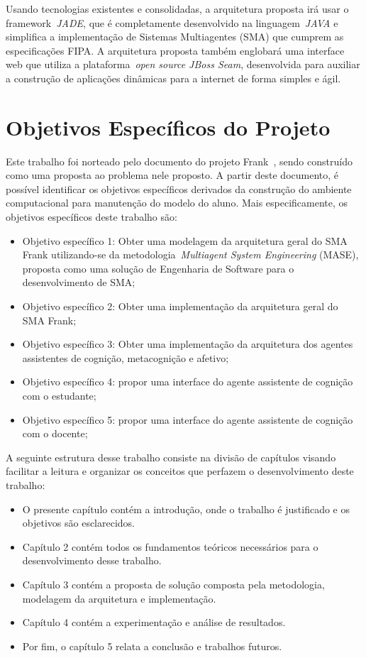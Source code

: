 Usando tecnologias existentes e consolidadas, a arquitetura proposta irá usar o framework~\emph{JADE}, que é completamente desenvolvido na linguagem~\emph{JAVA} e simplifica a implementação de Sistemas Multiagentes (SMA) que cumprem as especificações FIPA. A arquitetura proposta também englobará uma interface web que utiliza a plataforma~\emph{open source JBoss Seam}, desenvolvida para auxiliar a construção de aplicações dinâmicas para a internet de forma simples e ágil.

\section{Objetivos Específicos do Projeto}
Este trabalho foi norteado pelo documento do projeto Frank~\cite{editalFrank}, sendo construído como uma proposta ao problema nele proposto. A partir deste documento, é possível identificar os objetivos específicos derivados da construção do ambiente computacional para manutenção do modelo do aluno. Mais especificamente, os objetivos específicos deste trabalho são:
\begin{itemize}
 	\item Objetivo específico 1: Obter uma modelagem da arquitetura geral do SMA Frank utilizando-se da metodologia~\emph{Multiagent System Engineering} (MASE), proposta como uma solução de Engenharia de Software para o desenvolvimento de SMA;
	\item Objetivo específico 2: Obter uma implementação da arquitetura geral do SMA Frank;
	\item Objetivo específico 3: Obter uma implementação da arquitetura dos agentes assistentes de cognição, metacognição e afetivo;
	\item Objetivo específico 4: propor uma interface do agente assistente de cognição com o estudante;
	\item Objetivo específico 5: propor uma interface do agente assistente de cognição com o docente;
\end{itemize}

A seguinte estrutura desse trabalho consiste na divisão de capítulos visando facilitar a leitura e organizar os conceitos que perfazem o desenvolvimento deste trabalho:
\begin{itemize}
	\item O presente capítulo contém a introdução, onde o trabalho é justificado e os objetivos são esclarecidos.
	\item Capítulo 2 contém todos os fundamentos teóricos necessários para o desenvolvimento desse trabalho.
	\item Capítulo 3 contém a proposta de solução composta pela metodologia, modelagem da arquitetura e implementação.
	\item Capítulo 4 contém a experimentação e análise de resultados.
	\item Por fim, o capítulo 5 relata a conclusão e trabalhos futuros.
\end{itemize}
